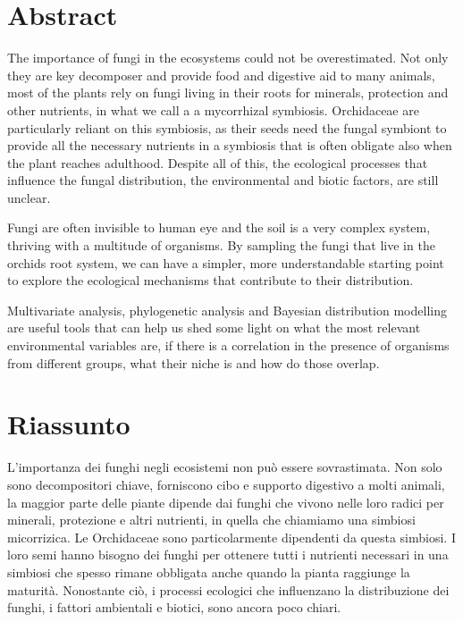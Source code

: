 \def\bibliocommand{}


\chapter{Abstract}
\label{abstract}

The importance of fungi in the ecosystems could not be overestimated. Not only they are key decomposer and provide food and digestive aid to many animals, most of the plants rely on fungi living in their roots for minerals, protection and other nutrients, in what we call a a mycorrhizal symbiosis. Orchidaceae are particularly reliant on this symbiosis, as their seeds need the fungal symbiont to provide all the necessary nutrients in a symbiosis that is often obligate also when the plant reaches adulthood. Despite all of this, the ecological processes that influence the fungal distribution, the environmental and biotic factors, are still unclear.

Fungi are often invisible to human eye and the soil is a very complex system, thriving with a multitude of organisms. By sampling the fungi that live in the orchids root system, we can have a simpler, more understandable starting point to explore the ecological mechanisms that contribute to their distribution.

Multivariate analysis, phylogenetic analysis and Bayesian distribution modelling are useful tools that can help us shed some light on what the most relevant environmental variables are, if there is a correlation in the presence of organisms from different groups, what their niche is and how do those overlap.

\chapter{Riassunto}
\label{riassunto}

L'importanza dei funghi negli ecosistemi non può essere sovrastimata. Non solo sono decompositori chiave, forniscono cibo e supporto digestivo a molti animali, la maggior parte delle piante dipende dai funghi che vivono nelle loro radici per minerali, protezione e altri nutrienti, in quella che chiamiamo una simbiosi micorrizica. Le Orchidaceae sono particolarmente dipendenti da questa simbiosi. I loro semi hanno bisogno dei funghi per ottenere tutti i nutrienti necessari in una simbiosi che spesso rimane obbligata anche quando la pianta raggiunge la maturità. Nonostante ciò, i processi ecologici che influenzano la distribuzione dei funghi, i fattori ambientali e biotici, sono ancora poco chiari.

